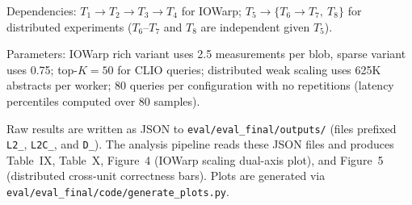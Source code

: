\documentclass[conference]{IEEEtran}
\begin{document}
Dependencies: $T_1 \rightarrow T_2 \rightarrow T_3 \rightarrow T_4$ for IOWarp; $T_5 \rightarrow \{T_6 \rightarrow T_7,\ T_8\}$ for distributed experiments ($T_6$--$T_7$ and $T_8$ are independent given $T_5$).

Parameters: IOWarp rich variant uses 2.5 measurements per blob, sparse variant uses 0.75; top-$K{=}50$ for CLIO queries; distributed weak scaling uses 625K abstracts per worker; 80 queries per configuration with no repetitions (latency percentiles computed over 80 samples).

\artout

Raw results are written as JSON to \texttt{eval/eval\_final/outputs/} (files prefixed \texttt{L2\_}, \texttt{L2C\_}, and \texttt{D\_}). The analysis pipeline reads these JSON files and produces Table~IX, Table~X, Figure~4 (IOWarp scaling dual-axis plot), and Figure~5 (distributed cross-unit correctness bars). Plots are generated via \texttt{eval/eval\_final/code/generate\_plots.py}.
\end{document}
